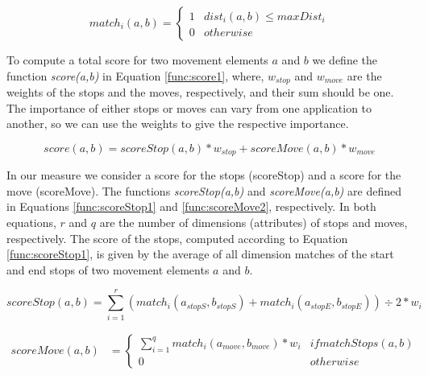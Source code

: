 \begin{equation}
\label{func:match1}
  match_i(a, b) = 
  \begin{cases} 
      1 & dist_i(a, b) \leq maxDist_i \\
      0 & otherwise
  \end{cases}
\end{equation}

To compute a total score for two movement elements $a$ and $b$ we define the function \emph{score(a,b)} in Equation \ref{func:score1}, where, $w_{stop}$ and $w_{move}$ are the weights of the stops and the moves, respectively, and their sum should be one. The importance of either stops or moves can vary from one application to another, so we can use the weights to give the respective importance. 


\begin{equation}
\label{func:score1}
score(a, b) = scoreStop(a, b) * w_{stop} + scoreMove(a, b) * w_{move}  
\end{equation}


In our measure we consider a score for the stops (scoreStop) and a score for the move (scoreMove). The functions \emph{scoreStop(a,b)} and \emph{scoreMove(a,b)} are defined in Equations \ref{func:scoreStop1} and \ref{func:scoreMove2}, respectively. In both equations, $r$ and $q$ are the number of dimensions (attributes) of stops and moves, respectively. The score of the stops, computed according to Equation \ref{func:scoreStop1}, is given by the average of all dimension matches of the start and end stops of two movement elements $a$ and $b$. 


\begin{equation}
\label{func:scoreStop1}
  scoreStop(a, b) = \sum\limits_{i=1}^r (match_i(a_{stopS}, b_{stopS}) + match_i(a_{stopE}, b_{stopE}))\div 2* w_{i}
\end{equation}


\begin{equation}
\label{func:scoreMove2}
\begin{split}
scoreMove(a, b)  & = 
  \begin{cases} 
      \sum\limits_{i=1}^q match_i(a_{move}, b_{move}) * w_{i} & if matchStops(a, b)\\
      0 & otherwise
  \end{cases}
\end{split}
\end{equation}



